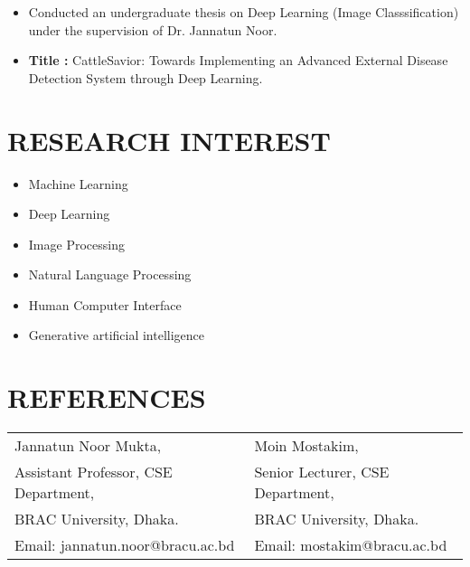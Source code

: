 \documentclass[letterpaper,11pt]{article}
\begin{document}
\begin{itemize}[left=0cm]
    \setlength\itemsep{-0.025em} %
    \setlength\parskip{-0.025em} %
    \fontsize{9.6}{11.2}\selectfont
  \item Conducted an undergraduate thesis on Deep Learning (Image Classsification) under the supervision of Dr. Jannatun Noor.
  \item \textbf{Title :} CattleSavior: Towards Implementing an Advanced External Disease Detection System through Deep Learning.
\end{itemize}


\section*{\textbf{RESEARCH INTEREST}}
\begin{minipage}[t]{0.33\textwidth}
  \begin{itemize}[left=0cm]
    \setlength\itemsep{-0.075em} %
    \setlength\parskip{-0.075em} %
    \item Machine Learning
    \item Deep Learning
  \end{itemize}
\end{minipage}%
\begin{minipage}[t]{0.33\textwidth}
  \begin{itemize}[left=0cm]
    \setlength\itemsep{-0.075em} %
    \setlength\parskip{-0.075em} %
    \item Image Processing
    \item Natural Language Processing
  \end{itemize}
\end{minipage}%
\begin{minipage}[t]{0.33\textwidth}
  \begin{itemize}[left=0cm]
    \setlength\itemsep{-0.075em} %
    \setlength\parskip{-0.075em}
    \item Human Computer Interface
    \item Generative artificial intelligence
  \end{itemize}
\end{minipage}




\section*{\textbf{REFERENCES}}
\begin{tabular}{@{}p{} p{}}
    Jannatun Noor Mukta, & Moin Mostakim, \\
    Assistant Professor, CSE Department, & Senior Lecturer, CSE Department, \\
    BRAC University, Dhaka. & BRAC University, Dhaka. \\
    Email: jannatun.noor@bracu.ac.bd & Email: mostakim@bracu.ac.bd \\
\end{tabular}
\end{document}
